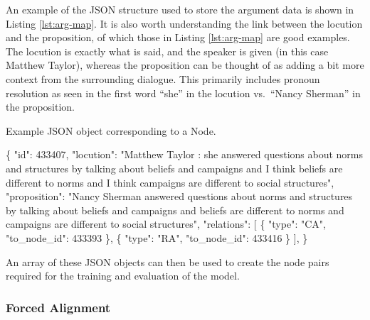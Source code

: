 \documentclass[twocolumn,twoside]{article}
\newenvironment{Shaded}{}{}
\newcommand{\DataTypeTok}[1]{\textcolor[rgb]{0.56,0.13,0.00}{#1}}
\newcommand{\DecValTok}[1]{\textcolor[rgb]{0.25,0.63,0.44}{#1}}
\newcommand{\FunctionTok}[1]{\textcolor[rgb]{0.02,0.16,0.49}{#1}}
\newcommand{\OtherTok}[1]{\textcolor[rgb]{0.00,0.44,0.13}{#1}}
\newcommand{\StringTok}[1]{\textcolor[rgb]{0.25,0.44,0.63}{#1}}
\begin{document}
An example of the JSON structure used to store the argument data is
shown in Listing \ref{lst:arg-map}. It is also worth understanding the
link between the locution and the proposition, of which those in Listing
\ref{lst:arg-map} are good examples. The locution is exactly what is
said, and the speaker is given (in this case Matthew Taylor), whereas
the proposition can be thought of as adding a bit more context from the
surrounding dialogue. This primarily includes pronoun resolution as seen
in the first word ``she'' in the locution vs.~``Nancy Sherman'' in the
proposition.

\begin{codelisting}

\caption{Example JSON object corresponding to a Node.}\label{lst:arg-map}

\begin{Shaded}
\begin{Highlighting}[numbers=left,,]
\FunctionTok{\{}
    \DataTypeTok{"id"}\FunctionTok{:} \DecValTok{433407}\FunctionTok{,}
    \DataTypeTok{"locution"}\FunctionTok{:} \StringTok{"Matthew Taylor : she answered questions about norms and structures by talking about beliefs and campaigns and I think beliefs are different to norms and I think campaigns are different to social structures"}\FunctionTok{,}
    \DataTypeTok{"proposition"}\FunctionTok{:} \StringTok{"Nancy Sherman answered questions about norms and structures by talking about beliefs and campaigns and beliefs are different to norms and campaigns are different to social structures"}\FunctionTok{,}
    \DataTypeTok{"relations"}\FunctionTok{:} \OtherTok{[}
        \FunctionTok{\{}
            \DataTypeTok{"type"}\FunctionTok{:} \StringTok{"CA"}\FunctionTok{,}
            \DataTypeTok{"to\_node\_id"}\FunctionTok{:} \DecValTok{433393}
        \FunctionTok{\}}\OtherTok{,}
        \FunctionTok{\{}
            \DataTypeTok{"type"}\FunctionTok{:} \StringTok{"RA"}\FunctionTok{,}
            \DataTypeTok{"to\_node\_id"}\FunctionTok{:} \DecValTok{433416}
        \FunctionTok{\}}
    \OtherTok{]}\FunctionTok{,}
\FunctionTok{\}}
\end{Highlighting}
\end{Shaded}

\end{codelisting}

An array of these JSON objects can then be used to create the node pairs
required for the training and evaluation of the model.

\subsubsection{Forced Alignment}\label{forced-alignment}
\end{document}
